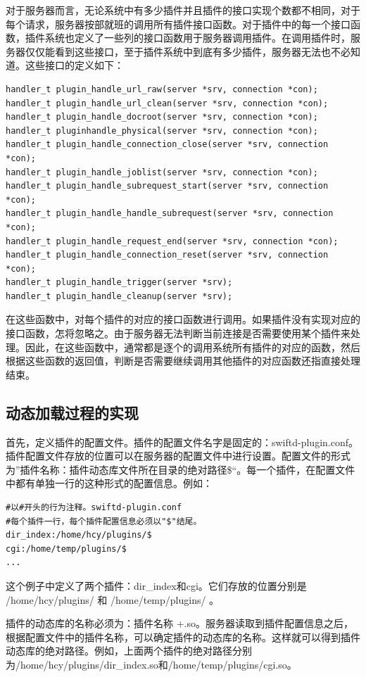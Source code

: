 \documentclass[twoside, xetex]{report}
\begin{document}
	对于服务器而言，无论系统中有多少插件并且插件的接口实现个数都不相同，对于每个请求，服务器按部就班的调用所有插件接口函数。对于插件中的每一个接口函数，插件系统也定义了一些列的接口函数用于服务器调用插件。在调用插件时，服务器仅仅能看到这些接口，至于插件系统中到底有多少插件，服务器无法也不必知道。这些接口的定义如下：
	
\begin{verbatim}
handler_t plugin_handle_url_raw(server *srv, connection *con);
handler_t plugin_handle_url_clean(server *srv, connection *con);
handler_t plugin_handle_docroot(server *srv, connection *con);
handler_t pluginhandle_physical(server *srv, connection *con);
handler_t plugin_handle_connection_close(server *srv, connection *con);
handler_t plugin_handle_joblist(server *srv, connection *con);
handler_t plugin_handle_subrequest_start(server *srv, connection *con);
handler_t plugin_handle_handle_subrequest(server *srv, connection *con);
handler_t plugin_handle_request_end(server *srv, connection *con);
handler_t plugin_handle_connection_reset(server *srv, connection *con);
handler_t plugin_handle_trigger(server *srv);
handler_t plugin_handle_cleanup(server *srv);
\end{verbatim}

	在这些函数中，对每个插件的对应的接口函数进行调用。如果插件没有实现对应的接口函数，怎将忽略之。由于服务器无法判断当前连接是否需要使用某个插件来处理。因此，在这些函数中，通常都是逐个的调用系统所有插件的对应的函数，然后根据这些函数的返回值，判断是否需要继续调用其他插件的对应函数还指直接处理结束。
	
\subsection{动态加载过程的实现}
	首先，定义插件的配置文件。插件的配置文件名字是固定的：swiftd-plugin.conf。插件配置文件存放的位置可以在服务器的配置文件中进行设置。配置文件的形式为”插件名称：插件动态库文件所在目录的绝对路径\$“。每一个插件，在配置文件中都有单独一行的这种形式的配置信息。例如：

\begin{verbatim}
#以#开头的行为注释。swiftd-plugin.conf
#每个插件一行，每个插件配置信息必须以"$"结尾。
dir_index:/home/hcy/plugins/$
cgi:/home/temp/plugins/$
...
\end{verbatim}

	这个例子中定义了两个插件：dir\_index和cgi。它们存放的位置分别是 /home/hcy/plugins/ 和 /home/temp/plugins/ 。
	
	插件的动态库的名称必须为：插件名称 +.so。服务器读取到插件配置信息之后，根据配置文件中的插件名称，可以确定插件的动态库的名称。这样就可以得到插件动态库的绝对路径。例如，上面两个插件的绝对路径分别为/home/hcy/plugins/dir\_index.so和/home/temp/plugins/cgi.so。
	
\end{document}
